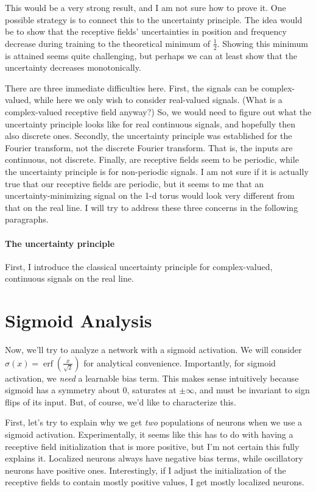 \documentclass{article}
\begin{document}
This would be a very strong result, and I am not sure how to prove it.
One possible strategy is to connect this to the uncertainty principle.
The idea would be to show that the receptive fields' uncertainties in position and frequency decrease during training to the theoretical minimum of $\frac{1}{2}$.
Showing this minimum is attained seems quite challenging, but perhaps we can at least show that the uncertainty decreases monotonically.

There are three immediate difficulties here.
First, the signals can be complex-valued, while here we only wish to consider real-valued signals.
(What is a complex-valued receptive field anyway?)
So, we would need to figure out what the uncertainty principle looks like for real continuous signals, and hopefully then also discrete ones.
Secondly, the uncertainty principle was established for the Fourier transform, not the discrete Fourier transform.
That is, the inputs are continuous, not discrete.
Finally, are receptive fields seem to be periodic, while the uncertainty principle is for non-periodic signals.
I am not sure if it is actually true that our receptive fields are periodic, but it seems to me that an uncertainty-minimizing signal on the 1-d torus would look very different from that on the real line.
I will try to address these three concerns in the following paragraphs.

\paragraph*{The uncertainty principle}
First, I introduce the classical uncertainty principle for complex-valued, continuous signals on the real line.


\section{Sigmoid Analysis}
Now, we'll try to analyze a network with a sigmoid activation.
We will consider $\sigma(x) = \operatorname{erf}(\frac{x}{\sqrt{2}})$ for analytical convenience.
Importantly, for sigmoid activation, we \emph{need} a learnable bias term.
This makes sense intuitively because sigmoid has a symmetry about 0, saturates at $\pm \infty$, and must be invariant to sign flips of its input.
But, of course, we'd like to characterize this.

First, let's try to explain why we get \emph{two} populations of neurons when we use a sigmoid activation.
Experimentally, it seems like this has to do with having a receptive field initialization that is more positive, but I'm not certain this fully explains it.
Localized neurons always have negative bias terms, while oscillatory neurons have positive ones.
Interestingly, if I adjust the initialization of the receptive fields to contain mostly positive values, I get mostly localized neurons.
\end{document}
